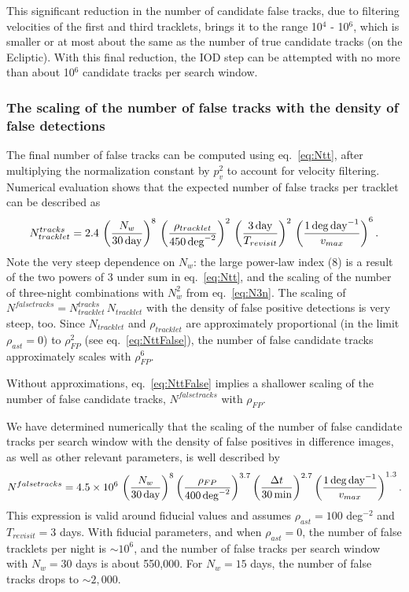 This significant reduction in the number of candidate false tracks, due to filtering velocities
of the first and third tracklets, brings it to the range 10$^{4}$ - 10$^{6}$, which is smaller or at 
most about the same as the number of true candidate tracks (on the Ecliptic). With this final 
reduction, the IOD step can be attempted with no more than about 10$^6$ candidate tracks per 
search window. 



\subsubsection{The scaling of the number of false tracks with the density of false detections} 

The final number of false tracks can be computed using eq.~\ref{eq:Ntt}, after multiplying 
the normalization constant by $p_v^2$ to account for velocity filtering. Numerical evaluation
shows that the expected number of false tracks per tracklet can be described as 
\begin{equation}
\label{eq:NttFinalFit}
   N_{tracklet}^{tracks} = 2.4 \, \left({N_w\over 30\, {\rm day}}\right)^8 \, \left( \rho_{tracklet}  \over 450
        \, {\rm deg}^{-2} \right)^2 \, \left( {3\,{\rm day} \over T_{revisit}} \right)^2 \, 
         \left( {1 \, {\rm deg} \, {\rm day}^{-1}  \over  v_{max} }\right)^6.
\end{equation}
Note the very steep dependence on $N_w$: the large power-law index (8) is a result of the two 
powers of 3 under sum in eq.~\ref{eq:Ntt}, and the scaling of the number of three-night 
combinations with $N_w^2$ from eq.~\ref{eq:N3n}. The scaling of $N^{falsetracks} = N_{tracklet}^{tracks} \, N_{tracklet}$ 
with the density of false positive detections is very steep, too. Since $N_{tracklet}$ and $\rho_{tracklet}$ 
are approximately proportional (in the limit $\rho_{ast}=0$) to $\rho_{FP}^2$ (see eq.~\ref{eq:NttFalse}), 
the number of false candidate tracks approximately scales with $\rho_{FP}^6$. 

Without approximations, eq.~\ref{eq:NttFalse} implies a shallower scaling of the number
of false candidate tracks, $N^{falsetracks}$ with $\rho_{FP}$. 

We have determined numerically that the scaling of the number 
of false candidate tracks per search window with the density of false positives in difference 
images, as well as other relevant parameters, is well described by 
\begin{equation}  
\label{eq:falsetracks}
   N^{falsetracks} = 4.5 \times 10^6 \, \left( {N_w \over 30 \, {\rm day} } \right)^{8} \left( {\rho_{FP} \over 400 \, {\rm deg}^{-2} }\right)^{3.7} 
    \left( {\Delta t  \over 30 \, {\rm min}} \right)^{2.7} 
     \left( { 1 \, {\rm deg} \, {\rm day}^{-1} \over v_{max} }  \right)^{1.3}. 
\end{equation} 
This expression is valid around fiducial values and assumes $\rho_{ast}=100$ deg$^{-2}$
and $T_{revisit}=3$ days. With fiducial parameters, and when $\rho_{ast}=0$, the number of 
false tracklets per night is $\sim10^6$, and the number of false tracks per search window
with $N_w=30$ days is about 550,000. For $N_w=15$ days,  the number of false tracks 
drops to $\sim2,000$. 

